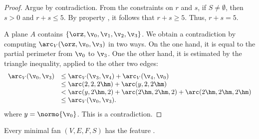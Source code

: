 \begin{proof} Argue by contradiction.  From the constraints on $r$ and
$s$, if $S\ne\emptyset$, then $s>0$ and $r+s\le 5$.
By property , it follows that $r+s\ge 5$.
Thus, $r+s=5$.  

A plane $A$ contains
$\{\orz,\v_0,\v_1,\v_2,\v_3\}$.  We obtain a contradiction
by computing $\arc_V(\orz,\v_0,\v_3)$ in two ways.  On the
one hand, it is equal to the partial perimeter from $\v_0$ to
$\v_3$.  One the other hand, it is estimated by the triangle
inequality, applied to the other two edges:
\begin{displaymath}
\begin{array}{lll}
\arc_V(\v_0,\v_3)
&\le\arc_V(\v_3,\v_4) + \arc_V(\v_4,\v_0) \\
&\le\arc(2,2,2\hm)+\arc(y,2,2\hm)\\
&<\arc(y,2\hm,2)+\arc(2\hm,2\hm,2) +\arc(2\hm,2\hm,2\hm)\\
&\le\arc_V(\v_0,\v_3).
\end{array}
\end{displaymath}
where $y=\normo{\v_0}$.
This is a contradiction.
\end{proof}

\begin{lemma}[]
Every minimal fan $(V,E,F,S)$ has the feature .
\end{lemma}

